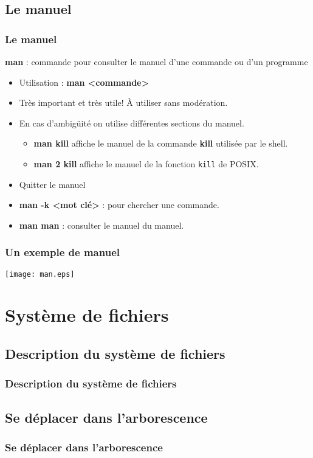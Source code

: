 \documentclass{beamer}
\begin{document}
    \subsection{Le manuel}
    \begin{frame}
        \frametitle{Le manuel}
        {\bf man} : commande pour consulter le manuel d'une commande ou d'un programme
        \begin{itemize}
            \item Utilisation : {\bf man <commande>}
            \item Très important et très utile! À utiliser sans modération.
            \item En cas d'ambigüité on utilise différentes sections du manuel.
                \begin{itemize}
                    \item {\bf man kill} affiche le manuel de la commande {\bf kill} utilisée par le shell.
                    \item {\bf man 2 kill} affiche le manuel de la fonction \texttt{kill} de POSIX.
                \end{itemize}
            \item Quitter le manuel 
            \item {\bf man -k <mot clé>} : pour chercher une commande.
            \item {\bf man man} : consulter le manuel du manuel.
        \end{itemize}
    \end{frame}

    \begin{frame}
        \frametitle{Un exemple de manuel}
        \texttt{[image: man.eps]}
    \end{frame}
    
    \section{Système de fichiers}
    \subsection{Description du système de fichiers}
    \begin{frame}
        \frametitle{Description du système de fichiers}
    \end{frame}

    \subsection{Se déplacer dans l'arborescence}
    \begin{frame}
        \frametitle{Se déplacer dans l'arborescence}
    \end{frame}
\end{document}
